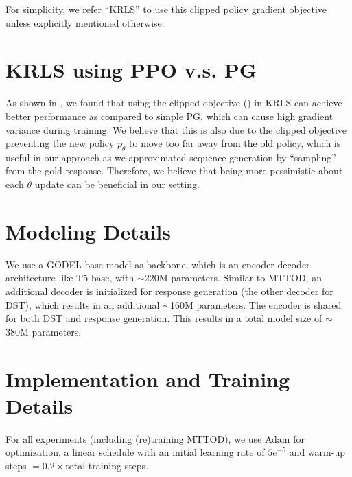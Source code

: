For simplicity, we refer ``KRLS'' to use this clipped policy gradient objective unless explicitly mentioned otherwise. 
\section{KRLS using PPO v.s. PG}
\label{sec:KRLS PPO v.s. PG}
As shown in , we found that using the clipped objective () in KRLS can achieve better performance as compared to simple PG, which can cause high gradient variance \cite{TRPO,TextGAIL} during training. We believe that this is also due to the clipped objective preventing the new policy $p_\theta$ to move too far away from the old policy, which is useful in our approach as we approximated sequence generation by ``sampling'' from the gold response. Therefore, we believe that being more pessimistic \cite{PPO} about each $\theta$ update can be beneficial in our setting.
\begin{table}[!h]
  \centering
  \caption{Performance comparison when training KRLS with Policy Gradient (PG) and a clipped version (PPO).}
  \label{tbl:rl_backbone_cmp}
\end{table}
\section{Modeling Details}
\label{sec:Modeling Details}
We use a GODEL-base model as backbone, which is an encoder-decoder architecture like T5-base, with $\sim$220M parameters. Similar to MTTOD, an additional decoder is initialized for response generation (the other decoder for DST), which results in an additional $\sim$160M parameters. The encoder is shared for both DST and response generation. This results in a total model size of $\sim$380M parameters.

\section{Implementation and Training Details}
\label{sec:Implementation and Training Details}
For all experiments (including (re)training MTTOD), we use Adam \cite{adam} for optimization, a linear schedule with an initial learning rate of $5e^{-5}$ and warm-up steps $=0.2\times$total training steps.

